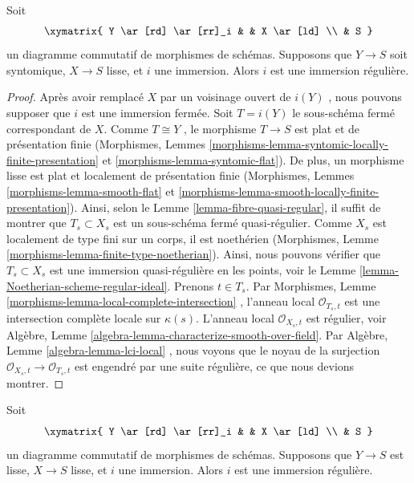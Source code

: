 \begin{lemma}
\label{lemma-immersion-lci-into-smooth-regular-immersion}
Soit
$$
\xymatrix{
Y \ar[rd] \ar[rr]_i & & X \ar[ld] \\
& S
}
$$
un diagramme commutatif de morphismes de schémas. Supposons que  $Y \to S$  soit
syntomique,  $X \to S$  lisse, et  $i$  une immersion. Alors  $i$ 
est une immersion régulière.
\end{lemma}

\begin{proof}
Après avoir remplacé  $X$  par un voisinage ouvert de  $i(Y)$ , nous
pouvons supposer que  $i$  est une immersion fermée. Soit  $T = i(Y)$  le
sous-schéma fermé correspondant de  $X$. Comme  $T \cong Y$ , le morphisme
 $T \to S$  est plat et de présentation finie (Morphismes, Lemmes  \ref{morphisms-lemma-syntomic-locally-finite-presentation} 
et  \ref{morphisms-lemma-syntomic-flat}). De plus, un morphisme lisse est plat et localement de
présentation finie (Morphismes, Lemmes  \ref{morphisms-lemma-smooth-flat}  et  \ref{morphisms-lemma-smooth-locally-finite-presentation}). Ainsi,
selon le Lemme  \ref{lemma-fibre-quasi-regular}, il suffit de montrer que  $T_s \subset X_s$  est un
sous-schéma fermé quasi-régulier. Comme  $X_s$  est localement de type fini
sur un corps, il est noethérien (Morphismes, Lemme  \ref{morphisms-lemma-finite-type-noetherian}). Ainsi, nous
pouvons vérifier que  $T_s \subset X_s$  est une immersion quasi-régulière en les points,
voir le Lemme  \ref{lemma-Noetherian-scheme-regular-ideal}. Prenons  $t \in T_s$. Par Morphismes, Lemme  \ref{morphisms-lemma-local-complete-intersection} ,
l'anneau local  $\mathcal{O}_{T_s, t}$  est une intersection complète locale sur  $\kappa(s)$.
L'anneau local  $\mathcal{O}_{X_s, t}$  est régulier, voir Algèbre, Lemme  \ref{algebra-lemma-characterize-smooth-over-field}. Par
Algèbre, Lemme  \ref{algebra-lemma-lci-local} , nous voyons que le noyau de la surjection
 $\mathcal{O}_{X_s, t} \to \mathcal{O}_{T_s, t}$  est engendré par une suite régulière, ce que nous devions montrer.
\end{proof}

\begin{lemma}
\label{lemma-immersion-smooth-into-smooth-regular-immersion}
Soit
$$
\xymatrix{
Y \ar[rd] \ar[rr]_i & & X \ar[ld] \\
& S
}
$$
un diagramme commutatif de morphismes de schémas. Supposons que  $Y \to S$  est
lisse,  $X \to S$  lisse, et  $i$  une immersion. Alors  $i$  est
une immersion régulière.
\end{lemma}

